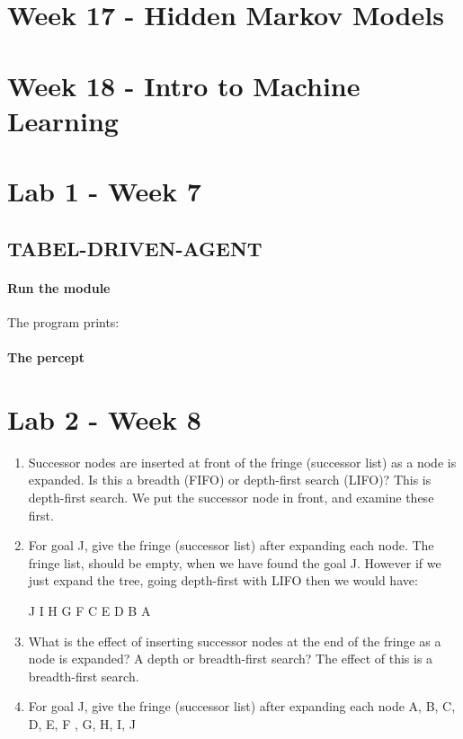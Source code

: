 \documentclass{article}
\begin{document}
\newpage
\section{Week 17 - Hidden Markov Models}%
\label{sec:27_march_hidden_markov_models}

\newpage
\section{Week 18 - Intro to Machine Learning}%
\label{sec:}

\newpage
\section{Lab 1 - Week 7}%
\label{sec:lab_week_7}

\subsection{TABEL-DRIVEN-AGENT}%
\label{sub:tabel_driven_agent}

\paragraph{Run the module}
The program prints:

\paragraph{The percept }

\newpage
\section{Lab 2 - Week 8}%
\label{sec:lab_week_8}

\begin{enumerate}
  \item Successor nodes are inserted at front of the fringe (successor list) as
    a node is expanded. Is this a breadth (FIFO) or depth-first search (LIFO)?
    \subitem This is depth-first search. We put the successor node in front, and
    examine these first.

  \item For goal J, give the fringe (successor list) after expanding each node.
    \subitem The fringe list, should be empty, when we have found the goal J.
    However if we just expand the tree, going depth-first with LIFO then we
    would have: 
    \begin{center}
      J I H G F C E D B A 
    \end{center}
  \item What is the effect of inserting successor nodes at the end of the fringe
    as a node is expanded? A depth or breadth-first search?
    \subitem The effect of this is a breadth-first search.
  \item For goal J, give the fringe (successor list) after expanding each node
    \subitem A, B, C, D, E, F , G, H, I, J
\end{enumerate}
\end{document}
